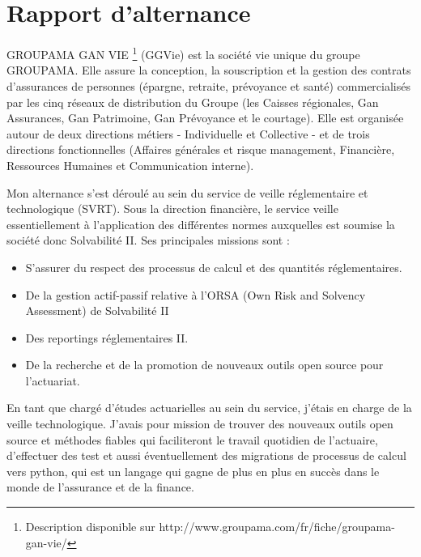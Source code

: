 \part{Rapport d'alternance}
\label{prt:missions} %

GROUPAMA GAN VIE \footnote{ Description disponible sur http://www.groupama.com/fr/fiche/groupama-gan-vie/} (GGVie) est la société vie unique du groupe GROUPAMA. Elle assure la conception, la souscription et la gestion des contrats d'assurances de personnes (épargne, retraite, prévoyance et santé) commercialisés par les cinq réseaux de distribution du Groupe (les Caisses régionales, Gan Assurances, Gan Patrimoine, Gan Prévoyance et le courtage). Elle est organisée autour de deux directions métiers - Individuelle et Collective - et de trois directions fonctionnelles (Affaires générales et risque management, Financière, Ressources Humaines et Communication interne).

Mon alternance s'est déroulé au sein du service de veille réglementaire et technologique (SVRT). Sous la direction financière, le service veille essentiellement à l'application des différentes normes auxquelles est soumise la société donc Solvabilité \textsc{II}. Ses principales missions sont :
\begin{itemize}
\item S'assurer du respect des processus de calcul et des quantités réglementaires.
\item De la gestion actif-passif relative à l'ORSA (Own Risk and Solvency Assessment) de Solvabilité \textsc{II}
\item Des reportings réglementaires \textsc{II}.
\item De la recherche et de la promotion de nouveaux outils open source pour l'actuariat.
\end{itemize}

En tant que chargé d'études actuarielles au sein du service, j'étais en charge de la veille technologique. J'avais pour mission de trouver des nouveaux outils open source et méthodes fiables qui faciliteront le travail quotidien de l'actuaire, d'effectuer des test et aussi éventuellement des migrations de processus de calcul vers python, qui est un langage qui gagne de plus en plus en succès dans le monde de l'assurance et de la finance.

